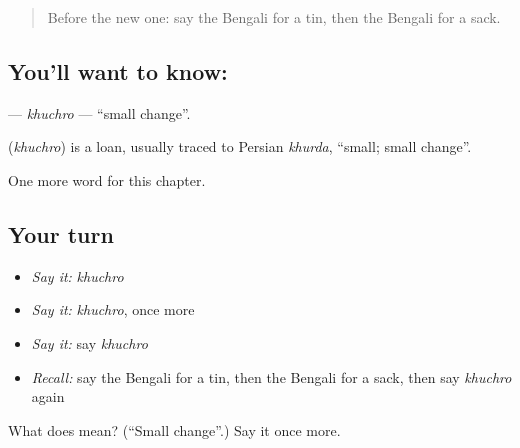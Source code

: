 \begin{quote}
Before the new one: say the Bengali for a tin, then the Bengali for a sack.
\end{quote}

\subsection*{You'll want to know: }
\textbf{} — \emph{khuchro} — \textquotedblleft{}small change\textquotedblright{}.

\begin{cousinweb}
\textbf{} (\emph{khuchro}) is a loan, usually traced to Persian \emph{khurda}, \textquotedblleft{}small; small change\textquotedblright{}.
\end{cousinweb}

\begin{grammarlens}[title={What you've built}]
One more word for this chapter.
\end{grammarlens}

\subsection*{Your turn}
\begin{itemize}
\raggedright
  \item \emph{Say it:} \emph{khuchro}
  \item \emph{Say it:} \emph{khuchro}, once more
  \item \emph{Say it:} say \emph{khuchro}
  \item \emph{Recall:} say the Bengali for a tin, then the Bengali for a sack, then say \emph{khuchro} again
\end{itemize}

\begin{tcolorbox}[breakable,colback=teal!4,colframe=teal!35!black,title={Before you move on}]
What does  mean? (\textquotedblleft{}Small change\textquotedblright{}.) Say it once more.
\end{tcolorbox}
